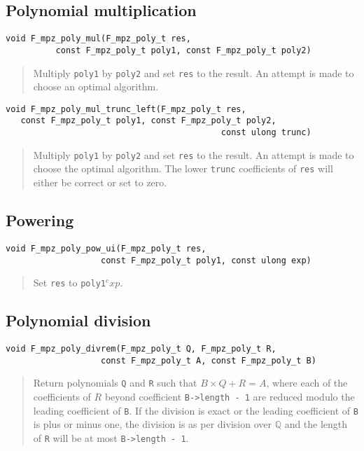 \documentclass[a4paper,10pt]{article}
\newcommand{\Q}{\mathbb{Q}}
\newcommand{\code}{\lstinline}
\begin{document}
\subsection{Polynomial multiplication}

\begin{lstlisting}
void F_mpz_poly_mul(F_mpz_poly_t res, 
          const F_mpz_poly_t poly1, const F_mpz_poly_t poly2)
\end{lstlisting}
\begin{quote}
Multiply \code{poly1} by \code{poly2} and set \code{res} to the result. An attempt is made to choose 
an optimal algorithm.
\end{quote}

\begin{lstlisting}
void F_mpz_poly_mul_trunc_left(F_mpz_poly_t res, 
   const F_mpz_poly_t poly1, const F_mpz_poly_t poly2, 
                                           const ulong trunc)
\end{lstlisting}
\begin{quote}
Multiply \code{poly1} by \code{poly2} and set \code{res} to the result. An attempt is made to choose 
the optimal algorithm. The lower \code{trunc} coefficients of \code{res} will either be correct or
set to zero.
\end{quote}

\subsection{Powering}

\begin{lstlisting}
void F_mpz_poly_pow_ui(F_mpz_poly_t res, 
                   const F_mpz_poly_t poly1, const ulong exp)
\end{lstlisting}
\begin{quote}
Set \code{res} to \code{poly1}$^exp$.
\end{quote}

\subsection{Polynomial division}

\begin{lstlisting}
void F_mpz_poly_divrem(F_mpz_poly_t Q, F_mpz_poly_t R, 
                   const F_mpz_poly_t A, const F_mpz_poly_t B)
\end{lstlisting}
\begin{quote}
Return polynomials \code{Q} and \code{R} such that $B\times Q + R = A$, where each of the coefficients
of $R$ beyond coefficient \code{B->length - 1} are reduced modulo the leading coefficient of \code{B}.
If the division is exact or the leading coefficient of \code{B} is plus or minus one, the division is
as per division over $\Q$ and the length of \code{R} will be at most \code{B->length - 1}.
\end{quote}
\end{document}
